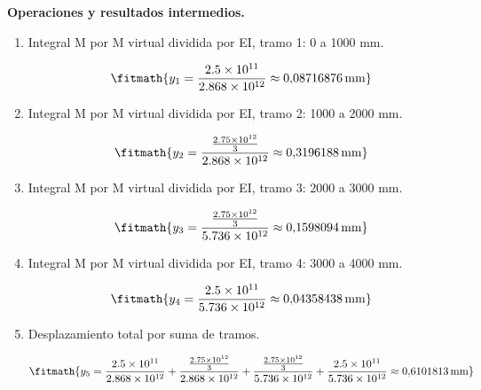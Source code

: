 \noindent\textbf{Operaciones y resultados intermedios.}

\begin{enumerate}

\item Integral M por M virtual dividida por EI, tramo 1: 0 a 1000 mm.

\[\fitmath{y_{1}=\frac{2.5\times10^{11}}{2.868\times10^{12}}\approx 0{,}08716876\,\mathrm{mm}}\]

\item Integral M por M virtual dividida por EI, tramo 2: 1000 a 2000 mm.

\[\fitmath{y_{2}=\frac{\frac{2.75\times10^{12}}{3}}{2.868\times10^{12}}\approx 0{,}3196188\,\mathrm{mm}}\]

\item Integral M por M virtual dividida por EI, tramo 3: 2000 a 3000 mm.

\[\fitmath{y_{3}=\frac{\frac{2.75\times10^{12}}{3}}{5.736\times10^{12}}\approx 0{,}1598094\,\mathrm{mm}}\]

\item Integral M por M virtual dividida por EI, tramo 4: 3000 a 4000 mm.

\[\fitmath{y_{4}=\frac{2.5\times10^{11}}{5.736\times10^{12}}\approx 0{,}04358438\,\mathrm{mm}}\]

\item Desplazamiento total por suma de tramos.

\[\fitmath{y_{5}=\frac{2.5\times10^{11}}{2.868\times10^{12}}+\frac{\frac{2.75\times10^{12}}{3}}{2.868\times10^{12}}+\frac{\frac{2.75\times10^{12}}{3}}{5.736\times10^{12}}+\frac{2.5\times10^{11}}{5.736\times10^{12}}\approx 0{,}6101813\,\mathrm{mm}}\]

\end{enumerate}
